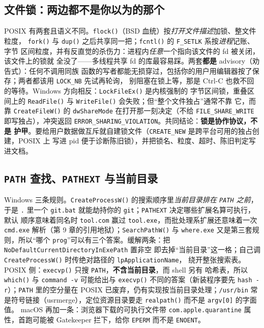 \documentclass[12pt,a4paper,fontset=fandol]{ctexbook}
\newcommand{\Fn}[1]{\texttt{#1()}}
\newcommand{\Tp}[1]{\texttt{#1}}
\newcommand{\Bk}{\allowbreak}
\begin{document}
\subsection{文件锁：两边都不是你以为的那个}

POSIX 有两套且语义不同。\Fn{flock}（BSD 血统）按\emph{打开文件描述}加锁、整文件粒度，
\Fn{fork} 与 \Fn{dup} 之后共享同一把；\Fn{fcntl} 的 \Tp{F\_SETLK} 系按\emph{进程}记账、字节
区间粒度，并有反直觉的杀伤力：进程内\emph{任意}一个指向该文件的 fd 被关闭，该文件上的锁就
全没了——多线程共享 fd 的库最容易踩。两套\textbf{都是} advisory（劝告式）：任何不调用同族
函数的写者都能无损穿过，包括你的用户用编辑器按了保存；两者都该用 \Tp{LOCK\_NB} 先试再轮询，
别阻塞在锁上等，那是 Ctrl-C 也救不回的等待。Windows 方向相反：\Fn{LockFileEx} 是内核强制的
字节区间锁，重叠区间上的 \Fn{ReadFile} 与 \Fn{WriteFile} 会失败；但``整个文件独占''通常不靠
它，而靠 \Fn{CreateFileW} 的 \Tp{dwShareMode} 在打开那一刻决定（不给 \Tp{FILE\_SHARE\_WRITE}
即写独占），冲突返回 \Tp{ERROR\_SHARING\Bk \_VIOLATION}。共同结论：\textbf{锁是协作协议，不是
护甲}。要给用户数据做互斥就自建锁文件（\Tp{CREATE\_NEW} 是跨平台可用的独占创建，POSIX 上
写进 pid 便于诊断陈旧锁），并把锁名、粒度、超时、陈旧判定写进文档。

\subsection{\Tp{PATH} 查找、\Tp{PATHEXT} 与当前目录}

Windows 三条规则。\Fn{CreateProcessW} 的搜索顺序里\emph{当前目录排在 \Tp{PATH} 之前}，于是
\Tp{.} 里一个 \Tp{git.bat} 就能劫持你的 \Tp{git}；\Tp{PATHEXT} 决定哪些扩展名算可执行，默认
顺序意味着同名时 \Tp{tool.com} 赢过 \Tp{tool.exe}，而批处理系扩展还意味着一次 \Tp{cmd.exe}
解析（第 9 章的引用地狱）；\Fn{SearchPathW} 与 \Tp{where.exe} 又是第三套规则，所以``哪个
\Tp{prog}''可以有三个答案。缓解两条：把 \Tp{NoDefault\Bk CurrentDirectoryInExePath} 置非空
即去掉``当前目录''这一格；自己调 \Fn{CreateProcessW} 时传绝对路径的 \Tp{lpApplicationName}，
绕开整张搜索表。POSIX 侧：\Fn{execvp} 只搜 \Tp{PATH}，\textbf{不含当前目录}，而 shell 另有
哈希表，所以 \Fn{which} 与 \Tp{command -v} 可能给出与 \Fn{execvp} 不同的答案（新装程序要先
\Tp{hash -r}）；\Tp{PATH} 里的空分量在 POSIX 已废弃，仍有实现按当前目录处理；\Tp{/usr/bin}
常是符号链接（usrmerge），定位资源目录要走 \Fn{realpath} 而不是 \Tp{argv[0]} 的字面值。
macOS 再加一条：浏览器下载的可执行文件带 \Tp{com.apple.quarantine} 属性，首跑可能被 Gatekeeper 拦下，给你 \Tp{EPERM} 而不是 \Tp{ENOENT}。
\end{document}
